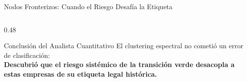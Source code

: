 \documentclass[aspectratio=169, 10pt]{beamer}
\begin{document}
\begin{frame}{Nodos Fronterizos: Cuando el Riesgo Desafía la Etiqueta}
\begin{columns}[c]
			\begin{column}{0.48\textwidth}
				\begin{alertblock}{Conclusión del Analista Cuantitativo}
					El clustering espectral no cometió un error de clasificación: \\
					\vspace{0.1cm}
					\textbf{Descubrió que el riesgo sistémico de la transición verde desacopla a estas empresas de su etiqueta legal histórica.}
				\end{alertblock}
				\vspace{0.3cm}
				\centering
			\end{column}
		\end{columns}

		
	\end{frame}
	
\end{document}
